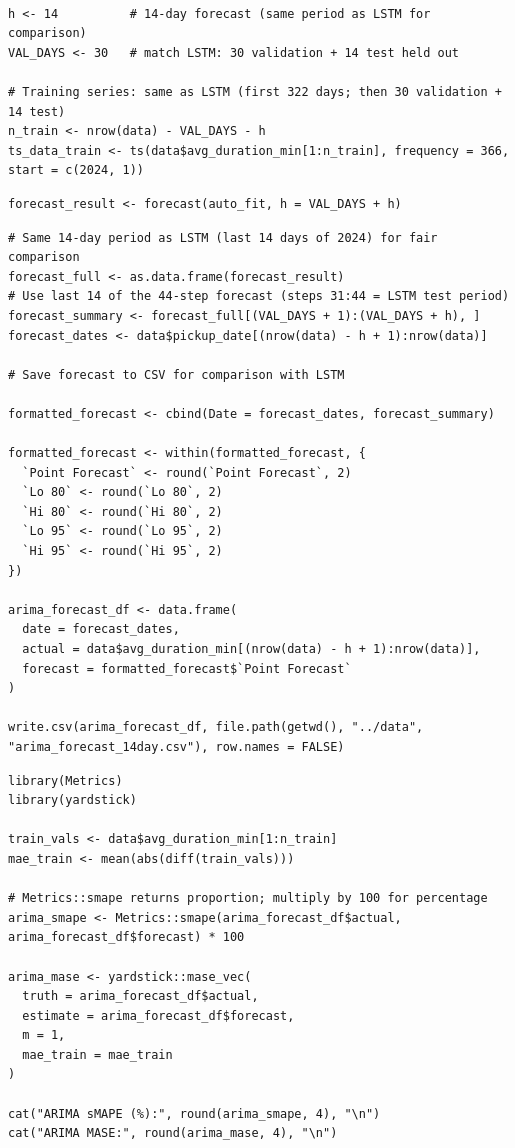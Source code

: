\documentclass[12pt, a4paper]{article}
\begin{document}
\begin{lstlisting}[style=pystyle, caption={Create Training Time Series}, label=lst:training_time_series]

h <- 14          # 14-day forecast (same period as LSTM for comparison)
VAL_DAYS <- 30   # match LSTM: 30 validation + 14 test held out

# Training series: same as LSTM (first 322 days; then 30 validation + 14 test)
n_train <- nrow(data) - VAL_DAYS - h
ts_data_train <- ts(data$avg_duration_min[1:n_train], frequency = 366, start = c(2024, 1))
\end{lstlisting}

\begin{lstlisting}[style=pystyle, caption={14-day Forecast}, label=lst:time_series_forecast]
forecast_result <- forecast(auto_fit, h = VAL_DAYS + h)
\end{lstlisting}

\begin{lstlisting}[style=pystyle, caption={14-day Forecast}, label=lst:save_ts_forecast]
# Same 14-day period as LSTM (last 14 days of 2024) for fair comparison
forecast_full <- as.data.frame(forecast_result)
# Use last 14 of the 44-step forecast (steps 31:44 = LSTM test period)
forecast_summary <- forecast_full[(VAL_DAYS + 1):(VAL_DAYS + h), ]
forecast_dates <- data$pickup_date[(nrow(data) - h + 1):nrow(data)]

# Save forecast to CSV for comparison with LSTM

formatted_forecast <- cbind(Date = forecast_dates, forecast_summary)

formatted_forecast <- within(formatted_forecast, {
  `Point Forecast` <- round(`Point Forecast`, 2)
  `Lo 80` <- round(`Lo 80`, 2)
  `Hi 80` <- round(`Hi 80`, 2)
  `Lo 95` <- round(`Lo 95`, 2)
  `Hi 95` <- round(`Hi 95`, 2)
})

arima_forecast_df <- data.frame(
  date = forecast_dates,
  actual = data$avg_duration_min[(nrow(data) - h + 1):nrow(data)],
  forecast = formatted_forecast$`Point Forecast`
)

write.csv(arima_forecast_df, file.path(getwd(), "../data", "arima_forecast_14day.csv"), row.names = FALSE)
\end{lstlisting}

\begin{lstlisting}[style=pystyle, caption={ARIMA Model Evaluation}, label=lst:time_series_eval]
library(Metrics)
library(yardstick)

train_vals <- data$avg_duration_min[1:n_train]
mae_train <- mean(abs(diff(train_vals)))

# Metrics::smape returns proportion; multiply by 100 for percentage
arima_smape <- Metrics::smape(arima_forecast_df$actual, arima_forecast_df$forecast) * 100

arima_mase <- yardstick::mase_vec(
  truth = arima_forecast_df$actual,
  estimate = arima_forecast_df$forecast,
  m = 1,
  mae_train = mae_train
)

cat("ARIMA sMAPE (%):", round(arima_smape, 4), "\n")
cat("ARIMA MASE:", round(arima_mase, 4), "\n")
\end{lstlisting}
\end{document}
